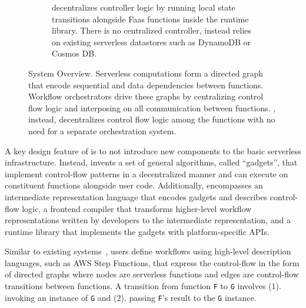 \begin{figure}[t]
\begin{subfigure}[b]{\columnwidth}
        \caption{\name{} decentralizes controller logic by running local state
                 transitions alongside Faas functions inside the \name{} runtime
                library. There is no centralized controller, instead \name{} relies on existing
                serverless datastores such as DynamoDB or Cosmos DB.}
        \label{fig:arch:unum-runtime}
    \end{subfigure}
    \caption{\name{} System Overview. Serverless computations form a directed
            graph that encode sequential and data dependencies between functions. Workflow
            orchestrators drive these graphs by centralizing control flow logic and
            interposing on all communication between functions. \name{},
            instead, decentralizes control flow logic among the functions with
            no need for a separate orchestration system.}
    \label{fig:arch}
\end{figure}



A key design feature of \name{} is to not introduce new components to the
basic serverless infrastructure. Instead, \name{} invents a set of general
algorithms, called ``gadgets'', that implement control-flow patterns in a
decentralized manner and can execute on constituent functions alongside user
code. Additionally, \name{} encompasses an intermediate representation
language that encodes gadgets and describes control-flow logic, a frontend
compiler that transforms higher-level workflow representations written by
developers to the intermediate representation, and a runtime library that
implements the gadgets with platform-specific APIs.

Similar to existing systems~\cite{aws-step-functions, google-workflows,
google-cloud-composer, gg-atc}, \name{} users define workflows using
high-level description languages, such as AWS Step Functions, that express the
control-flow in the form of directed graphs where nodes are serverless
functions and edges are control-flow transitions between functions. A
transition from function \texttt{F} to \texttt{G} involves (1). invoking an
instance of \texttt{G} and (2). passing \texttt{F}'s result to the \texttt{G}
instance.


